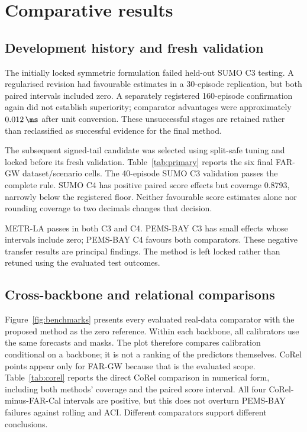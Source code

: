 \section{Comparative results}\label{sec:results}

\subsection{Development history and fresh validation}
The initially locked symmetric formulation failed held-out SUMO C3 testing. A regularised revision had favourable estimates in a 30-episode replication, but both paired intervals included zero. A separately registered 160-episode confirmation again did not establish superiority; comparator advantages were approximately $0.012\,\ms$ after unit conversion. These unsuccessful stages are retained rather than reclassified as successful evidence for the final method.

The subsequent signed-tail candidate was selected using split-safe tuning and locked before its fresh validation. Table~\ref{tab:primary} reports the six final FAR-GW dataset/scenario cells. The 40-episode SUMO C3 validation passes the complete rule. SUMO C4 has positive paired score effects but coverage 0.8793, narrowly below the registered floor. Neither favourable score estimates alone nor rounding coverage to two decimals changes that decision.

METR-LA passes in both C3 and C4. PEMS-BAY C3 has small effects whose intervals include zero; PEMS-BAY C4 favours both comparators. These negative transfer results are principal findings. The method is left locked rather than retuned using the evaluated test outcomes.

\subsection{Cross-backbone and relational comparisons}
Figure~\ref{fig:benchmarks} presents every evaluated real-data comparator with the proposed method as the zero reference. Within each backbone, all calibrators use the same forecasts and masks. The plot therefore compares calibration conditional on a backbone; it is not a ranking of the predictors themselves. CoRel points appear only for FAR-GW because that is the evaluated scope. Table~\ref{tab:corel} reports the direct CoRel comparison in numerical form, including both methods' coverage and the paired score interval. All four CoRel-minus-FAR-Cal intervals are positive, but this does not overturn PEMS-BAY failures against rolling and ACI. Different comparators support different conclusions.

